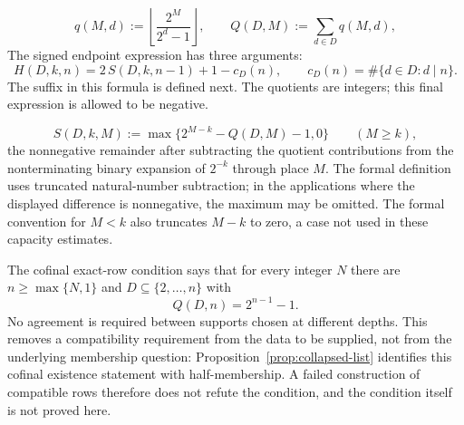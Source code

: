 \begin{defn}\label{record:257bm-d2}
\[
\ensuremath{q}(M,d) := \left\lfloor \frac{2^M}{2^d-1} \right\rfloor,\qquad
\ensuremath{Q}(D,M) := \sum_{d\in D} \ensuremath{q}(M,d),
\]
The signed endpoint expression has three arguments:
\[
 \ensuremath{H}(D,k,n)
 =2\,\ensuremath{S}(D,k,n-1)+1-c_D(n),
 \qquad c_D(n)=\#\{d\in D:d\mid n\}.
\]
The suffix in this formula is defined next.  The quotients are integers;
this final expression is allowed to be negative.
\par\noindent   {}  
\end{defn}

\begin{defn}\label{record:257bm-d3}
\[
\ensuremath{S}(D,k,M)
 :=\max\{2^{M-k}-\ensuremath{Q}(D,M)-1,0\}
 \qquad(M\ge k),
\]
the nonnegative remainder after subtracting the quotient contributions
from the nonterminating binary expansion of $2^{-k}$ through place $M$.
The formal definition uses truncated natural-number subtraction; in the
applications where the displayed difference is nonnegative, the maximum
may be omitted.  The formal convention for $M<k$ also truncates $M-k$
to zero, a case not used in these capacity estimates.
\par\noindent   {}
\end{defn}

\begin{defn}\label{record:257bm-d4}
The cofinal exact-row condition says that for every integer $N$
there are $n\ge\max\{N,1\}$ and
$D\subseteq\{2,\ldots,n\}$ with
\[
 Q(D,n)=2^{n-1}-1.
\]
No agreement is required between supports chosen at different depths.
This removes a compatibility requirement from the data to be supplied,
not from the underlying membership question:
Proposition~\ref{prop:collapsed-list} identifies this cofinal
existence statement with half-membership.  A failed construction
of compatible rows therefore does not refute the condition,
and the condition itself is not proved here.
\par\noindent   {}
\end{defn}


